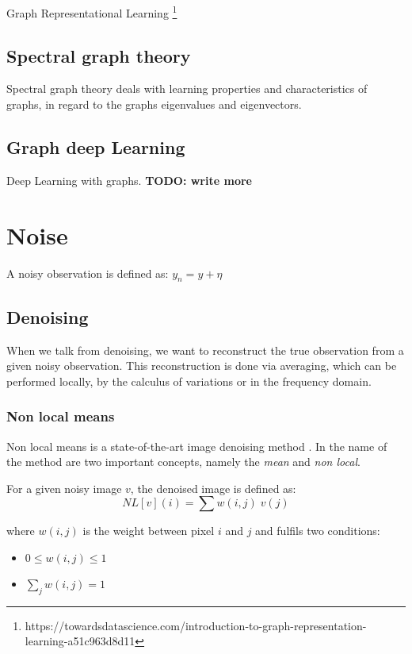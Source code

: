Graph Representational Learning
\footnote{https://towardsdatascience.com/introduction-to-graph-representation-learning-a51c963d8d11}


\subsection{Spectral graph theory}
Spectral graph theory \cite{SpectralGraphTheory} deals with learning properties and characteristics of graphs, in regard to
the graphs eigenvalues and eigenvectors. 

\subsection{Graph deep Learning}
Deep Learning with graphs.
\textbf{TODO: write more}


\section{Noise}
A noisy observation is defined as:
$y_n = y + \eta$

\subsection{Denoising}
When we talk from denoising, we want to reconstruct the true observation 
from a given noisy observation. This reconstruction is done via averaging, which can be performed
locally, by the calculus of variations or in the frequency domain.

\subsubsection{Non local means}
Non local means is a state-of-the-art image denoising method \cite{noneLocalMean}.
In the name of the method are two important concepts, namely the \textit{mean}
and \textit{non local}.

For a given noisy image $v$, the denoised image is defined as:
\begin{equation}
    NL[v](i) = \sum{w(i,j) \; v(j)}
\end{equation}

where $w(i,j)$ is the weight between pixel $i$ and $j$ and fulfils two conditions:
\begin{itemize}
    \item $0 \le w(i,j) \le 1$
    \item $\sum_j{w(i,j) = 1}$
\end{itemize}

